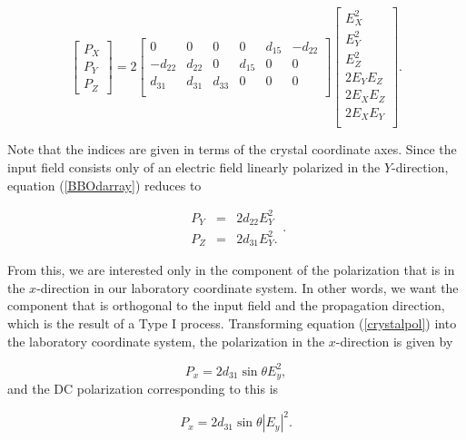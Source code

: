 \begin{equation}\label{BBOdarray}
\left[ \begin{array}{c} P_X \\
P_Y \\
P_Z \end{array} \right]= 2 \left[ \begin{array}{cccccc}
0 & 0 & 0 & 0 & d_{15} & -d_{22} \\
-d_{22} & d_{22} & 0 & d_{15} & 0 & 0 \\
d_{31} & d_{31} & d_{33} & 0 & 0 & 0 \\
\end{array}\right]
\left[ \begin{array}{c} E_X^2 \\
E_Y^2 \\
E_Z^2 \\
2 E_Y E_Z \\
2 E_X E_Z \\
2 E_X E_Y \\
\end{array} \right].
\end{equation}

Note that the indices are given in terms of the crystal coordinate
axes.  Since the input field consists only of an electric field
linearly polarized in the $Y$-direction, equation
(\ref{BBOdarray}) reduces to

\begin{equation}
\label{crystalpol}
\begin{array}{ccc}
P_Y &=& 2d_{22}E_Y^2 \\%
P_Z &=& 2d_{31}E_Y^2. \end{array}.
\end{equation}

From this, we are interested only in the component of the
polarization that is in the $x$-direction in our laboratory
coordinate system.  In other words, we want the component that is
orthogonal to the input field and the propagation direction, which
is the result of a Type I process.  Transforming equation
(\ref{crystalpol}) into the laboratory coordinate system, the
polarization in the $x$-direction is given by

\begin{equation}
P_x=2d_{31} \sin{\theta} E_y^2,
\end{equation} and the DC polarization corresponding to this is

\begin{equation} \label{ORpolsign}
P_x=2d_{31} \sin{\theta} \left| E_y\right|^2 .
\end{equation}


